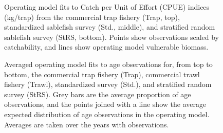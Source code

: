 \documentclass[11pt]{book}
\begin{document}
\begin{figure}[htb]

{\centering {} 

}

\caption{Operating model fits to Catch per Unit of Effort (CPUE) indices (kg/trap) from the commercial trap fishery (Trap, top), standardized sablefish survey (Std., middle), and stratified random sablefish survey (StRS, bottom). Points show observations scaled by catchability, and lines show operating model vulnerable biomass.}\label{fig:unnamed-chunk-16}
\end{figure}
\newpage
\begin{figure}[htb]

{\centering {} 

}

\caption{Averaged operating model fits to age observations for, from top to bottom, the commercial trap fishery (Trap), commercial trawl fishery (Trawl), standardized survey (Std.), and stratified random survey (StRS). Grey bars are the average proportion of age observations, and the points joined with a line show the average expected distribution of age observations in the operating model. Averages are taken over the years with observations.}\label{fig:unnamed-chunk-17}
\end{figure}
\newpage
\end{document}
